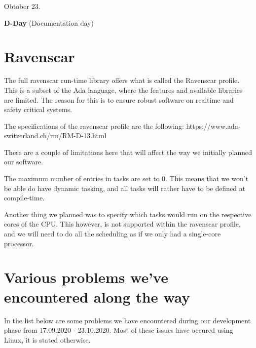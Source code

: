 \documentclass{article}
\begin{document}
\vspace{5mm}

Obtober 23.

\textbf{D-Day} (Documentation day)

\section{Ravenscar}

The full ravenscar run-time library offers what is called the Ravenscar profile. This is a subset of the Ada language, where the features and available libraries are limited. The reason for this is to ensure robust software on realtime and safety critical systems. 

The specifications of the ravenscar profile are the following:
https://www.ada-switzerland.ch/rm/RM-D-13.html

There are a couple of limitations here that will affect the way we initially planned our software. 

The maximum number of entries in tasks are set to 0. This means that we won't be able do have dynamic tasking, and all tasks will rather have to be defined at compile-time. 

Another thing we planned was to specify which tasks would run on the respective cores of the CPU. This however, is not supported within the ravenscar profile, and we will need to do all the scheduling as if we only had a single-core processor. 

\section{Various problems we've encountered along the way}
In the list below are some problems we have encountered during our development phase from 17.09.2020 - 23.10.2020. Most of these issues have occured using Linux, it is stated otherwise.
\end{document}
